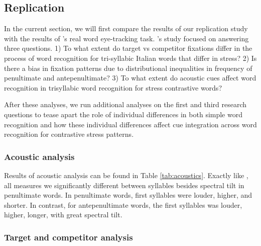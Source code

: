 \subsection{Replication}

In the current section, we will first compare the results of our replication study with the results of \cite{Sulpizio_McQueen_2012}'s real word eye-tracking task. \cite{Sulpizio_McQueen_2012}'s study focused on answering three questions. 1) To what extent do target vs competitor fixations differ in the process of word recognition for tri-syllabic Italian words that differ in stress? 2) Is there a bias in fixation patterns due to distributional inequalities in frequency of penultimate and antepenultimate? 3) To what extent do acoustic cues affect word recognition in trisyllabic word recognition for stress contrastive words? 

After these analyses, we run additional analyses on the first and third research questions to tease apart the role of individual differences in both simple word recognition and how these individual differences affect cue integration across word recognition for contrastive stress patterns. 

\subsubsection{Acoustic analysis}
Results of acoustic analysis can be found in Table \ref{tab:acoustics}. Exactly like \cite{Sulpizio_McQueen_2012}, all measures we significantly different between syllables besides spectral tilt in penultimate words. In penultimate words, first syllables were louder, higher, and shorter. In contrast, for antepenultimate words, the first syllables was louder, higher, longer, with great spectral tilt.


\subsubsection{Target and competitor analysis}

